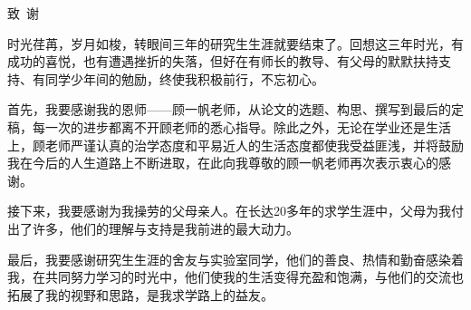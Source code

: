 \begin{szuAppendix}{致~谢}

\songti{}
\setlength{\baselineskip}{23pt}

时光荏苒，岁月如梭，转眼间三年的研究生生涯就要结束了。回想这三年时光，有成功的喜悦，也有遭遇挫折的失落，但好在有师长的教导、有父母的默默扶持支持、有同学少年间的勉励，终使我积极前行，不忘初心。

首先，我要感谢我的恩师——顾一帆老师，从论文的选题、构思、撰写到最后的定稿，每一次的进步都离不开顾老师的悉心指导。除此之外，无论在学业还是生活上，顾老师严谨认真的治学态度和平易近人的生活态度都使我受益匪浅，并将鼓励我在今后的人生道路上不断进取，在此向我尊敬的顾一帆老师再次表示衷心的感谢。

接下来，我要感谢为我操劳的父母亲人。在长达20多年的求学生涯中，父母为我付出了许多，他们的理解与支持是我前进的最大动力。

最后，我要感谢研究生生涯的舍友与实验室同学，他们的善良、热情和勤奋感染着我，在共同努力学习的时光中，他们使我的生活变得充盈和饱满，与他们的交流也拓展了我的视野和思路，是我求学路上的益友。


\end{szuAppendix}

